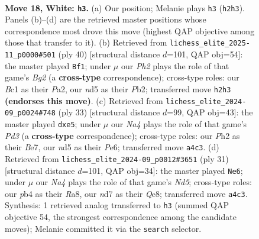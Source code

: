 \documentclass[11pt]{article}
\begin{document}
\begin{figure}[p]\centering
\begin{subfigure}{0.46\textwidth}\centering
\resizebox{\linewidth}{!}{%
\newchessgame
\chessboard[
  setfen={r6r/p2nkppp/2pbp3/1q1n1PP1/Np1P3N/4P3/PP5P/R1BQ1RK1 w - - 1 18},
  showmover=false,
  pgfstyle=straightmove, color=movearrow, markmove={h2-h3}
]}
\caption{}
\end{subfigure}\hfill
\begin{subfigure}{0.46\textwidth}\centering
\resizebox{\linewidth}{!}{%
\newchessgame
\chessboard[
  setfen={1r2r1k1/5pbp/p1pp2p1/2n1pP2/2qnP1PP/2N1B3/PP1Q1RB1/R5K1 w - - 0 21},
  showmover=false,
  pgfstyle=straightmove, color=movearrow, markmove={g2-f1}
]}
\caption{}
\end{subfigure}
\\[4pt]
\begin{subfigure}{0.46\textwidth}\centering
\resizebox{\linewidth}{!}{%
\newchessgame
\chessboard[
  setfen={2r1k2r/2q1bp2/p2ppn1p/1pn1P1p1/3N1PP1/P1N5/1PP3QP/1K1RB2R b k - 0 17},
  showmover=false,
  pgfstyle=straightmove, color=movearrow, markmove={d6-e5}
]}
\caption{}
\end{subfigure}\hfill
\begin{subfigure}{0.46\textwidth}\centering
\resizebox{\linewidth}{!}{%
\newchessgame
\chessboard[
  setfen={r1b1q1k1/bppr2pp/p2p4/1P1NppN1/2Pn4/P2PP1P1/5PBP/R2Q1RK1 b - - 0 16},
  showmover=false,
  pgfstyle=straightmove, color=movearrow, markmove={d4-e6}
]}
\caption{}
\end{subfigure}
\caption{\textbf{Move 18, White: \texttt{h3}.} (a) Our position; Melanie plays \texttt{h3} (\texttt{h2h3}). Panels (b)--(d) are the retrieved master positions whose correspondence most drove this move (highest QAP objective among those that transfer to it). (b) Retrieved from \texttt{lichess\_elite\_2025-11\_p0000\#501} (ply 40) [structural distance $d$=101, QAP obj=54]: the master played \texttt{Bf1}; under $\mu$ our \emph{Ph2} plays the role of that game's \emph{Bg2} (a \textbf{cross-type} correspondence); cross-type roles: our \emph{B}c1 as their \emph{P}a2, our \emph{n}d5 as their \emph{P}b2; transferred move \texttt{h2h3} \textbf{(endorses this move)}. (c) Retrieved from \texttt{lichess\_elite\_2024-09\_p0024\#748} (ply 33) [structural distance $d$=99, QAP obj=43]: the master played \texttt{dxe5}; under $\mu$ our \emph{Na4} plays the role of that game's \emph{Pd3} (a \textbf{cross-type} correspondence); cross-type roles: our \emph{P}h2 as their \emph{B}e7, our \emph{n}d5 as their \emph{P}e6; transferred move \texttt{a4c3}. (d) Retrieved from \texttt{lichess\_elite\_2024-09\_p0012\#3651} (ply 31) [structural distance $d$=101, QAP obj=34]: the master played \texttt{Ne6}; under $\mu$ our \emph{Na4} plays the role of that game's \emph{Nd5}; cross-type roles: our \emph{p}b4 as their \emph{R}a8, our \emph{n}d7 as their \emph{Q}e8; transferred move \texttt{a4c3}. Synthesis: 1 retrieved analog transferred to \texttt{h3} (summed QAP objective 54, the strongest correspondence among the candidate moves); Melanie committed it via the \texttt{search} selector.}
\label{fig:thought-m34}
\end{figure}
\end{document}
